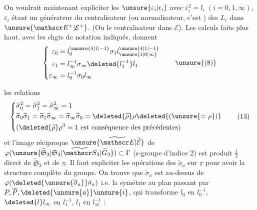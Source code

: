 On voudrait maintenant expliciter les $\unsure{\varepsilon_i|\epsilon_i}$ avec $\varepsilon_i^2=l_i$ $(i=0,1,\infty)$, $\varepsilon_i$ étant un générateur du centralisateur (ou normalisateur, c'est ) des $L_i$ dans $\unsure{\mathscr E^+|\mathcal E^+}$. (Ou le centralisateur dans $\mathscr E$). Les calculs faits plus haut, avec les chgts de notation indiqués, donnent
\[
\left\{\begin{aligned}
\varepsilon_0&=l_0^{\unsure{4|1|-1}}\sigma_1l_{\unsure{1|0|\infty}}^{\unsure{4|1|-1}}\\
\varepsilon_1&=l_\infty^{-1}\sigma_\infty\deleted{l_1^{-1}}l_1\\
\varepsilon_\infty&=l_0^{-1}\sigma_0l_\infty
\end{aligned}\right.\tag*{\unsure{(8)}}
\]

 les relations
\[
\left\{\begin{aligned}
&\widetilde\sigma_0^2=\widetilde\sigma_1^2=\widetilde\sigma_\infty^2=1\\
&\widetilde\sigma_0\widetilde\sigma_1=\widetilde\sigma_1\widetilde\sigma_\infty=\widetilde\sigma_\infty\widetilde\sigma_0=\deleted{\widetilde\rho}\rho\deleted{(\unsure{=\rho})}\\
&(\deleted{\widetilde\rho}\rho^3=1\text{ est conséquence des précédentes})
\end{aligned}\right.\tag*{(13)}
\]
et l'image réciproque $\unsure{\widetilde{\mathscr E}|\widetilde{\mathcal E}}$ de $\varphi(\unsure{\widetilde{\mathfrak S}_3|\mathfrak S_3|\widetilde{\mathscr S}_3|\widetilde G_3})\subset\Gamma$ (s-groupe d'indice 2) est produit $\frac12$ direct de $\widetilde{\mathfrak S}_3$ et de $\pi$. Il faut expliciter les opérations des $\widetilde\sigma_a$ sur $\pi$ pour avoir la structure complète du groupe. On trouve que $\widetilde\sigma_a$ est au-dessus de $\varphi(\deleted{\unsure{\widetilde\sigma_a}}\dot\sigma_a)$ i.e. la symétrie  au plan passant par $P,\overline P,\deleted{\unsure{a}}\unsure{i}$, qui transforme $l_0$ en $l_0^{-1}$, $\deleted{l}l_\infty$ en $l_1^{-1}$, $l_1$ en $l_\infty^{-1}$ :
